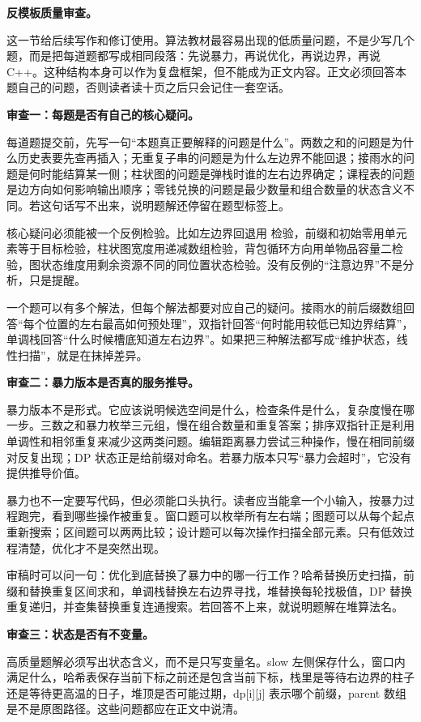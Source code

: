 \noindent\textbf{反模板质量审查。}

这一节给后续写作和修订使用。算法教材最容易出现的低质量问题，不是少写几个题，而是把每道题都写成相同段落：先说暴力，再说优化，再说边界，再说 C++。这种结构本身可以作为复盘框架，但不能成为正文内容。正文必须回答本题自己的问题，否则读者读十页之后只会记住一套空话。

\noindent\textbf{审查一：每题是否有自己的核心疑问。}

每道题提交前，先写一句“本题真正要解释的问题是什么”。两数之和的问题是为什么历史表要先查再插入；无重复子串的问题是为什么左边界不能回退；接雨水的问题是何时能结算某一侧；柱状图的问题是弹栈时谁的左右边界确定；课程表的问题是边方向如何影响输出顺序；零钱兑换的问题是最少数量和组合数量的状态含义不同。若这句话写不出来，说明题解还停留在题型标签上。

核心疑问必须能被一个反例检验。比如左边界回退用  检验，前缀和初始零用单元素等于目标检验，柱状图宽度用递减数组检验，背包循环方向用单物品容量二检验，图状态维度用剩余资源不同的同位置状态检验。没有反例的“注意边界”不是分析，只是提醒。

一个题可以有多个解法，但每个解法都要对应自己的疑问。接雨水的前后缀数组回答“每个位置的左右最高如何预处理”，双指针回答“何时能用较低已知边界结算”，单调栈回答“什么时候槽底知道左右边界”。如果把三种解法都写成“维护状态，线性扫描”，就是在抹掉差异。

\noindent\textbf{审查二：暴力版本是否真的服务推导。}

暴力版本不是形式。它应该说明候选空间是什么，检查条件是什么，复杂度慢在哪一步。三数之和暴力枚举三元组，慢在组合数量和重复答案；排序双指针正是利用单调性和相邻重复来减少这两类问题。编辑距离暴力尝试三种操作，慢在相同前缀对反复出现；DP 状态正是给前缀对命名。若暴力版本只写“暴力会超时”，它没有提供推导价值。

暴力也不一定要写代码，但必须能口头执行。读者应当能拿一个小输入，按暴力过程跑完，看到哪些操作被重复。窗口题可以枚举所有左右端；图题可以从每个起点重新搜索；区间题可以两两比较；设计题可以每次操作扫描全部元素。只有低效过程清楚，优化才不是突然出现。

审稿时可以问一句：优化到底替换了暴力中的哪一行工作？哈希替换历史扫描，前缀和替换重复区间求和，单调栈替换左右边界寻找，堆替换每轮找极值，DP 替换重复递归，并查集替换重复连通搜索。若回答不上来，就说明题解在堆算法名。

\noindent\textbf{审查三：状态是否有不变量。}

高质量题解必须写出状态含义，而不是只写变量名。slow 左侧保存什么，窗口内满足什么，哈希表保存当前下标之前还是包含当前下标，栈里是等待右边界的柱子还是等待更高温的日子，堆顶是否可能过期，dp[i][j] 表示哪个前缀，parent 数组是不是原图路径。这些问题都应在正文中说清。

